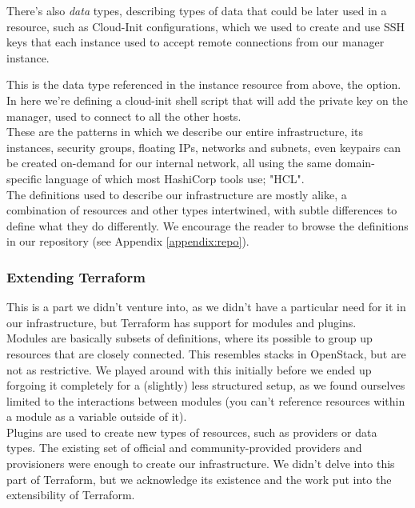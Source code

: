                 There's also \textit{data} types, describing types of data that could be later used in a resource, such as Cloud-Init configurations, which we used to create and use SSH keys that each instance used to accept remote connections from our manager instance.
                
                
                This is the data type referenced in the instance resource from above, the  option. In here we're defining a cloud-init shell script that will add the private key on the manager, used to connect to all the other hosts.\\

                These are the patterns in which we describe our entire infrastructure, its instances, security groups, floating IPs, networks and subnets, even keypairs can be created on-demand for our internal network, all using the same domain-specific language of which most HashiCorp tools use; "HCL".\\
            
                The definitions used to describe our infrastructure are mostly alike, a combination of resources and other types intertwined, with subtle differences to define what they do differently. We encourage the reader to browse the definitions in our repository (see Appendix \ref{appendix:repo}).
            
            \subsubsection{Extending Terraform}
                This is a part we didn't venture into, as we didn't have a particular need for it in our infrastructure, but Terraform has support for modules and plugins.\\
                
                Modules are basically subsets of definitions, where its possible to group up resources that are closely connected. This resembles stacks in OpenStack, but are not as restrictive. We played around with this initially before we ended up forgoing it completely for a (slightly) less structured setup, as we found ourselves limited to the interactions between modules (you can't reference resources within a module as a variable outside of it).\\
                
                Plugins are used to create new types of resources, such as providers or data types. The existing set of official and community-provided providers and provisioners were enough to create our infrastructure. We didn't delve into this part of Terraform, but we acknowledge its existence and the work put into the extensibility of Terraform.

